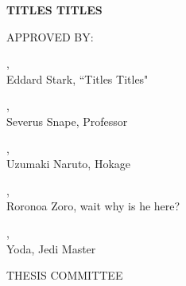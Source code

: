 \begin{center}

\Large
\textbf{TITLES TITLES}


\vspace{3cm}

\large
APPROVED BY:\\
\vspace{1cm}

\underline{\hspace{5cm}},\\
Eddard Stark, ``Titles Titles"\\
\vspace{1cm}

\underline{\hspace{5cm}},\\
Severus Snape, Professor\\
\vspace{1cm}

\underline{\hspace{5cm}},\\
Uzumaki Naruto, Hokage\\
\vspace{1cm}

\underline{\hspace{5cm}},\\
Roronoa Zoro, wait why is he here?\\
\vspace{1cm}

\underline{\hspace{5cm}},\\
Yoda, Jedi Master\\


\vspace{3cm}

THESIS COMMITTEE
    
\end{center}







\pagebreak